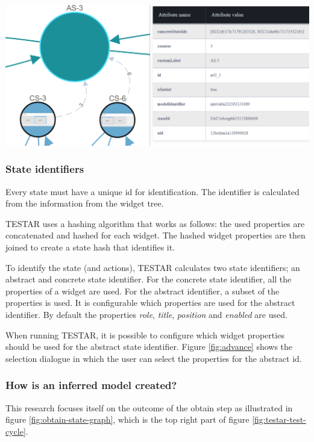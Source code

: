 \bigskip
\begingroup
\captionsetup{type=figure}
\includegraphics[scale=0.5]{pics/abstract-model.png}
\label{fig:abstract-model}
\endgroup

\subsubsection{State identifiers} \label{state-identifiers}
Every state must have a unique id for identification. The identifier is calculated from the information from the widget tree. 

TESTAR uses a hashing algorithm that works as follows: the used properties are concatenated and hashed for each widget. The hashed widget properties are then joined to create a state hash that identifies it. 

To identify the state (and actions), TESTAR calculates two state identifiers; an abstract and concrete state identifier. For the concrete state identifier, all the properties of a widget are used. For the abstract identifier, a subset of the properties is used. It is configurable which properties are used for the abstract identifier. By default the properties \textit{role}, \textit{title}, \textit{position} and \textit{enabled} are used.

When running TESTAR, it is possible to configure which widget properties should be used for the abstract state identifier. Figure \ref{fig:advance} shows the selection dialogue in which the user can select the properties for the abstract id.

\subsubsection{How is an inferred model created?}
This research focuses itself on the outcome of the obtain step as illustrated in figure \ref{fig:obtain-state-graph}, which is the top right part of figure \ref{fig:testar-test-cycle}.

